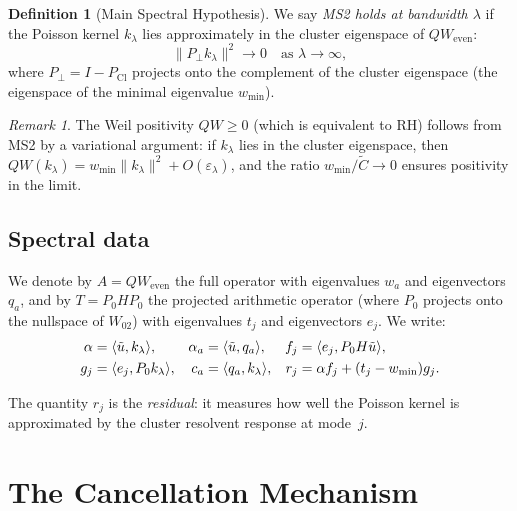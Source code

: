 \documentclass[12pt,a4paper]{article}
\theoremstyle{definition}
\newtheorem{definition}[theorem]{Definition}
\theoremstyle{remark}
\newtheorem{remark}[theorem]{Remark}
\newcommand{\Cl}{\mathrm{Cl}}
\newcommand{\ip}[2]{\langle #1, #2 \rangle}
\newcommand{\norm}[1]{\| #1 \|}
\newcommand{\utilde}{\tilde{u}}
\newcommand{\Ctilde}{\tilde{C}}
\newcommand{\wmin}{w_{\min}}
\begin{document}
\begin{definition}[Main Spectral Hypothesis]
\label{def:MS2}
We say \emph{MS2 holds at bandwidth $\lambda$} if the Poisson kernel
$k_\lambda$ lies approximately in the cluster eigenspace of $QW_{\mathrm{even}}$:
\begin{equation}
\label{eq:MS2}
\norm{P_\perp k_\lambda}^2 \to 0 \quad \text{as } \lambda \to \infty,
\end{equation}
where $P_\perp = I - P_{\Cl}$ projects onto the complement of the
cluster eigenspace (the eigenspace of the minimal eigenvalue $\wmin$).
\end{definition}

\begin{remark}
The Weil positivity $QW \geq 0$ (which is equivalent to RH) follows
from MS2 by a variational argument: if $k_\lambda$ lies in the cluster
eigenspace, then $QW(k_\lambda) = \wmin \norm{k_\lambda}^2 + O(\varepsilon_\lambda)$,
and the ratio $\wmin / \Ctilde \to 0$ ensures positivity in the limit.
\end{remark}

\subsection{Spectral data}

We denote by $A = QW_{\mathrm{even}}$ the full operator with
eigenvalues $w_a$ and eigenvectors $q_a$, and by $T = P_0 H P_0$
the projected arithmetic operator (where $P_0$ projects onto the
nullspace of $W_{02}$) with eigenvalues $t_j$ and eigenvectors $e_j$.
We write:
\begin{align}
\alpha &= \ip{\utilde}{k_\lambda}, &
\alpha_a &= \ip{\utilde}{q_a}, &
f_j &= \ip{e_j}{P_0 H \utilde}, \\
g_j &= \ip{e_j}{P_0 k_\lambda}, &
c_a &= \ip{q_a}{k_\lambda}, &
r_j &= \alpha f_j + (t_j - \wmin) g_j. \notag
\end{align}

The quantity $r_j$ is the \emph{residual}: it measures how well the
Poisson kernel is approximated by the cluster resolvent response at
mode~$j$.

\section{The Cancellation Mechanism}
\label{sec:mechanism}
\end{document}
